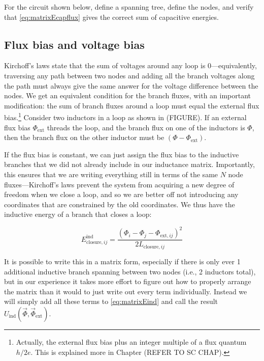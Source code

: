\begin{exercise}
    For the circuit shown below, define a spanning tree, define the nodes, and verify that \cref{eq:matrixEcapflux} gives the correct sum of capacitive energies. \\
\end{exercise}

\subsection{Flux bias and voltage bias}
Kirchoff's laws state that the sum of voltages around any loop is 0---equivalently, traversing any path between two nodes and adding all the branch voltages along the path must  always give the same answer for the voltage difference between the nodes. We get an equivalent condition for the branch fluxes, with an important modification: the sum of branch fluxes around a loop must equal the external flux bias.\footnote{Actually, the external flux bias plus an integer multiple of a flux quantum $h/2e$. This is explained more in Chapter (REFER TO SC CHAP).} Consider two inductors in a loop as shown in (FIGURE). If an external flux bias $\Phi_\mathrm{ext}$ threads the loop, and the branch flux on one of the inductors is $\Phi$, then the branch flux on the other inductor must be $(\Phi - \Phi_\mathrm{ext})$. 

If the flux bias is constant, we can just assign the flux bias to the inductive branches that we did not already include in our inductance matrix. Importantly, this ensures that we are writing everything still in terms of the same $N$ node fluxes---Kirchoff's laws prevent the system from acquiring a new degree of freedom when we close a loop, and so we are better off not introducing any coordinates that are constrained by the old coordinates. We thus have the inductive energy of a branch that closes a loop:

\begin{equation}
\label{eq:Eindclosure}
  E_{\mathrm{closure},ij}^\mathrm{ind} = \frac{(\Phi_i-\Phi_j-\Phi_{\mathrm{ext},ij})^2}{2L_{\mathrm{closure},ij}}
\end{equation}

It is possible to write this in a matrix form, especially if there is only ever 1 additional inductive branch spanning between two nodes (i.e., 2 inductors total), but in our experience it takes more effort to figure out how to properly arrange the matrix than it would to just write out every term individually.  Instead we will simply add all these terms to \cref{eq:matrixEind} and call the result $U_\mathrm{ind}(\vec{\Phi}, \vec{\Phi}_\mathrm{ext})$.



